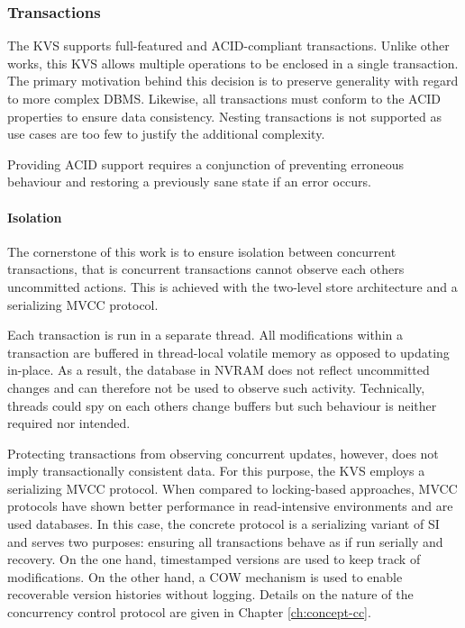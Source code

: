 
\subsubsection{Transactions}

The KVS supports full-featured and ACID-compliant transactions. Unlike other
works, this KVS allows multiple operations to be enclosed in a single
transaction. The primary motivation behind this decision is to preserve
generality with regard to more complex DBMS. Likewise, all transactions must
conform to the ACID properties to ensure data consistency. Nesting transactions
is not supported as use cases are too few to justify the additional complexity.

Providing ACID support requires a conjunction of preventing erroneous behaviour
and restoring a previously sane state if an error occurs.

\paragraph{Isolation}

The cornerstone of this work is to ensure isolation between concurrent
transactions, that is concurrent transactions cannot observe each others
uncommitted actions. This is achieved with the two-level store architecture and
a serializing MVCC protocol.

Each transaction is run in a separate thread. All modifications within a
transaction are buffered in thread-local volatile memory as opposed to updating
in-place. As a result, the database in NVRAM does not reflect uncommitted
changes and can therefore not be used to observe such activity. Technically,
threads could spy on each others change buffers but such behaviour is neither
required nor intended.

Protecting transactions from observing concurrent updates, however, does not
imply transactionally consistent data. For this purpose, the KVS employs a
serializing MVCC protocol. When compared to locking-based approaches, MVCC
protocols have shown better performance in read-intensive environments and are
used databases. In this case, the concrete protocol is a serializing variant of
SI and serves two purposes: ensuring all transactions behave as if run serially
and recovery. On the one hand, timestamped versions are used to keep track of
modifications. On the other hand, a COW mechanism is used to enable recoverable
version histories without logging. Details on the nature of the concurrency
control protocol are given in Chapter \ref{ch:concept-cc}.

